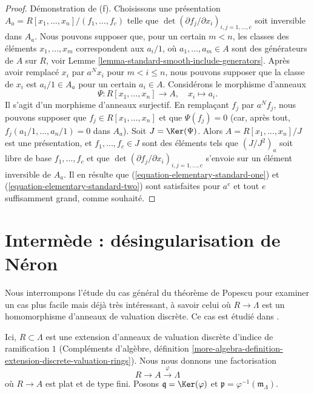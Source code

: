 \begin{proof}
\medskip\noindent
Démonstration de (f). Choisissons une présentation
$A_a = R[x_1, \ldots, x_n]/(f_1, \ldots, f_c)$ telle que
$\det(\partial f_j/\partial x_i)_{i, j = 1, \ldots, c}$
soit inversible dans $A_a$. Nous pouvons supposer que, pour un certain $m < n$,
les classes des éléments $x_1, \ldots, x_m$ correspondent aux $a_i/1$, où
$a_1, \ldots, a_m \in A$ sont des générateurs de $A$ sur $R$, voir
Lemme \ref{lemma-standard-smooth-include-generators}.
Après avoir remplacé $x_i$ par $a^Nx_i$ pour $m < i \leq n$, nous pouvons
supposer que la classe de $x_i$ est $a_i/1 \in A_a$ pour un certain $a_i \in A$.
Considérons le morphisme d'anneaux
$$
\Psi : R[x_1, \ldots, x_n] \longrightarrow A,\quad
x_i \longmapsto a_i.
$$
Il s'agit d'un morphisme d'anneaux surjectif. En remplaçant $f_j$ par $a^Nf_j$,
nous pouvons supposer que $f_j \in R[x_1, \ldots, x_n]$ et que
$\Psi(f_j) = 0$ (car, après tout, $f_j(a_1/1, \ldots, a_n/1) = 0$ dans $A_a$).
Soit $J = \Ker(\Psi)$. Alors $A = R[x_1, \ldots, x_n]/J$ est une présentation,
et $f_1, \ldots, f_c \in J$ sont des éléments tels que $(J/J^2)_a$ soit libre
de base $f_1, \ldots, f_c$ et que
$\det(\partial f_j/\partial x_i)_{i, j = 1, \ldots, c}$ s'envoie sur un élément
inversible de $A_a$. Il en résulte que
(\ref{equation-elementary-standard-one}) et
(\ref{equation-elementary-standard-two})
sont satisfaites pour $a^e$ et tout $e$ suffisamment grand, comme souhaité.
\end{proof}
\section{Intermède : désingularisation de Néron}
\label{section-neron}

\noindent
Nous interrompons l'étude du cas général du théorème de Popescu pour
examiner un cas plus facile mais déjà très intéressant, à savoir celui où
$R \to \Lambda$ est un homomorphisme d'anneaux de valuation discrète.
Ce cas est étudié dans
\cite[Section 4]{Artin-Algebraic-Approximation}.

\begin{situation}
\label{situation-neron}
Ici, $R \subset \Lambda$ est une extension d'anneaux de valuation discrète
d'indice de ramification $1$ (Compléments d'algèbre, définition
\ref{more-algebra-definition-extension-discrete-valuation-rings}).
Nous nous donnons une factorisation
$$
R \to A \xrightarrow{\varphi} \Lambda
$$
où $R \to A$ est plat et de type fini. Posons $\mathfrak q = \Ker(\varphi)$
et $\mathfrak p = \varphi^{-1}(\mathfrak m_\Lambda)$.
\end{situation}

